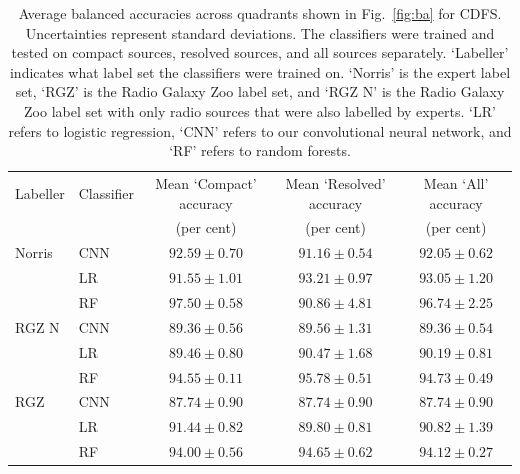 \documentclass[fleqn,usenatbib,usedcolumn]{mnras}
\begin{document}
  \begin{table}
    \caption{Average balanced accuracies across quadrants shown in Fig.~\ref{fig:ba} for CDFS.
      Uncertainties represent standard deviations.
      The classifiers were trained and tested on compact sources, resolved sources, and all
      sources separately. `Labeller' indicates what label set the classifiers were trained
      on. `Norris' is the expert label set, `RGZ' is the Radio Galaxy Zoo label
      set, and `RGZ N' is the Radio Galaxy Zoo label set with only radio sources
      that were also labelled by experts. `LR' refers to
      logistic regression, `CNN' refers to our convolutional neural network, and
      `RF' refers to random forests.}
    \label{ba:average-accuracies}
    \begin{tabular}{llccc}
\hline
Labeller & Classifier & Mean `Compact' accuracy & Mean `Resolved' accuracy & Mean `All' accuracy\\
 & & (per cent) & (per cent) & (per cent)\\
\hline
Norris & CNN & $92.59 \pm 0.70$ & $91.16 \pm 0.54$ & $92.05 \pm 0.62$\\
 & LR & $91.55 \pm 1.01$ & $93.21 \pm 0.97$ & $93.05 \pm 1.20$\\
 & RF & $97.50 \pm 0.58$ & $90.86 \pm 4.81$ & $96.74 \pm 2.25$\\
RGZ N & CNN & $89.36 \pm 0.56$ & $89.56 \pm 1.31$ & $89.36 \pm 0.54$\\
 & LR & $89.46 \pm 0.80$ & $90.47 \pm 1.68$ & $90.19 \pm 0.81$\\
 & RF & $94.55 \pm 0.11$ & $95.78 \pm 0.51$ & $94.73 \pm 0.49$\\
RGZ & CNN & $87.74 \pm 0.90$ & $87.74 \pm 0.90$ & $87.74 \pm 0.90$\\
 & LR & $91.44 \pm 0.82$ & $89.80 \pm 0.81$ & $90.82 \pm 1.39$\\
 & RF & $94.00 \pm 0.56$ & $94.65 \pm 0.62$ & $94.12 \pm 0.27$\\
\hline
\end{tabular}
\end{table}
\end{document}
